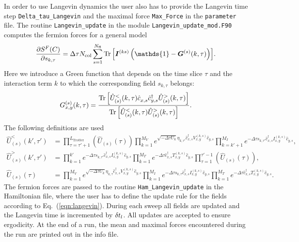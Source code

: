 In order to use Langevin dynamics the user also has to provide the Langevin time step \texttt{Delta\_tau\_Langevin} and the maximal force \texttt{Max\_Force} in the \texttt{parameter} file. The routine  \texttt{Langevin\_update} in the module \texttt{Langevin\_update\_mod.F90}   computes the fermion forces  for a  general model
\begin{equation}
 \frac { \partial S^F(C)}{\partial s_{k,\tau} } 
 	= \Delta \tau {N_{\mathrm{col}}} \sum\limits_{s=1}^{N_{\mathrm{fl}}} \Tr{\left[ \bm{I}^{(ks)}\left(\mathds{1} - \bm{G}^{(s)}(k,\tau) \right) \right]} .
\end{equation}
Here we introduce a Green function that depends on the time slice $\tau$  and the interaction term $k$ to which the corresponding field $s_{k,\tau}$ belongs:
\begin{equation}
G_{x,y}^{(s)}(k,\tau) = \frac{\Tr{\left[ \hat{U}_{(s)}^{<}(k,\tau) \hat{c}_{x,s}^{\phantom\dagger} \hat{c}_{y,s}^{\dagger} \hat{U}_{(s)}^{>}(k,\tau) \right]} }
{\Tr{\left[ \hat{U}_{(s)}^{<}(k,\tau)\hat{U}_{(s)}^{>}(k,\tau) \right]}}.
\end{equation}
The following definitions are used
\begin{align}
 \hat{U}_{(s)}^{<}(k',\tau') &= \prod_{\tau=\tau'+1}^{L_{\text{Trotter}}}  \left( \hat{U}_{(s)}(\tau) \right)
  \prod_{k=1}^{M_V} e^{\sqrt{-\Delta\tau U_k}  \eta_{k,\tau'} \hat{c}_{x,s}^{\dagger} V_{x,y}^{(k,s)} \hat{c}_{y,s}^{\phantom\dagger}}
\prod_{k=k'+1}^{M_I} e^{-\Delta\tau s_{k,\tau'} \hat{c}_{x,s}^{\dagger} I_{x,y}^{(k,s)} \hat{c}_{y,s}^{\phantom\dagger}}, \\
 \hat{U}_{(s)}^{>}(k',\tau') &= \prod_{k=1}^{k'} e^{-\Delta \tau s_{k,\tau'}  \hat{c}_{x,s}^{\dagger} I_{x,y}^{(k,s)} \hat{c}_{y,s}^{\phantom\dagger}}
  \prod_{k=1}^{M_T}   e^{-\Delta\tau  \hat{c}_{x,s}^{\dagger} T_{x,y}^{(k,s)} \hat{c}_{y,s}^{\phantom\dagger}} 
  \prod_{\tau=1}^{\tau'-1}  \left( \hat{U}_{(s)}(\tau) \right), \\
  \hat{U}_{(s)}(\tau) &= \prod_{k=1}^{M_V} e^{\sqrt{-\Delta\tau U_k}  \eta_{k,\tau} \hat{c}_{x,s}^{\dagger} V_{x,y}^{(k,s)} \hat{c}_{y,s}^{\phantom\dagger}} 
  \prod_{k=1}^{M_I} e^{-\Delta\tau s_{k,\tau} \hat{c}_{x,s}^{\dagger} I_{x,y}^{(k,s)} \hat{c}_{y,s}^{\phantom\dagger}}
    \prod_{k=1}^{M_T}   e^{-\Delta\tau  \hat{c}_{x,s}^{\dagger} T_{x,y}^{(k,s)} \hat{c}_{y,s}^{\phantom\dagger}} .
\end{align}
 The fermion forces are passed to the routine \texttt{Ham\_Langevin\_update} in the Hamiltonian file, where the user has to define the update rule for the fields according to Eq.~(\ref{eqn:langevin}). During each sweep all fields are updated and the Langevin time is incremented by $\delta t_{l}$. All updates are accepted to ensure ergodicity. At the end of a run, the mean and maximal forces encountered during the run are printed out in the info file. 

